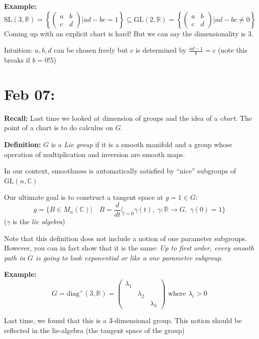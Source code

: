 \documentclass[12pt]{article}
\newcommand{\R}{\mathbb{R}}
\newcommand{\C}{\mathbb{C}}
\newcommand{\SL}{\text{SL}}
\newcommand{\GL}{\text{GL}}
\begin{document}
    \textbf{Example:} 
    \[\SL(3, \R) = \left\{\begin{pmatrix}
        a & b\\ 
        c & d
    \end{pmatrix} \bigg\vert ad - bc = 1\right\} \subseteq \GL(2, \R) = \left\{\begin{pmatrix}
        a & b\\ 
        c & d
    \end{pmatrix} \bigg\vert ad - bc \neq 0\right\}\]
    Coming up with an explicit chart is hard! But we can say the dimensionality is $3$. 

    Intuition: $a, b, d$ can be chosen freely but $c$ is determined by $\frac{ad - 1}{b} = c$ (note this breaks if $b = 0$!5)

\section{Feb 07:}
    \textbf{Recall:} Last time we looked at dimension of groups and the idea of a \emph{chart.} The point of a chart is to do calculus on $G$. 

    \textbf{Definition:} $G$ is a \emph{Lie group} if it is a smooth manifold and a group whose operation of multiplication and inversion are smooth maps.

    In our context, smoothness is automatically satisfied by ``nice'' subgroups of $\GL(n, \C)$

    Our ultimate goal is to construct a tangent space at $g = 1 \in G$: 
    \[g = \{B \in M_n(\C) \bigg\vert \quad B = \frac{d}{dt}\bigg\vert_{t = 0} \gamma(t), \; \gamma: \R\to G,\; \gamma(0) = 1\}\]
    ($\gamma$ is the \emph{lie algebra})

    Note that this definition does not include a notion of one parameter subgroups. However, you can in fact show that it is the same: \emph{Up to first order, every smooth path in $G$ is going to look exponential or like a one parameter subgroup.}

    \textbf{Example:} 
    \[G = \text{diag}^+(3, \R) = \begin{pmatrix}
        \lambda_1\\ 
        & \lambda_2\\
        & & \lambda_3
    \end{pmatrix} \text{ where } \lambda_i > 0\]

    Last time, we found that this is a 3-dimensional group. This notion should be reflected in the lie-algebra (the tangent space of the group) 
\end{document}
